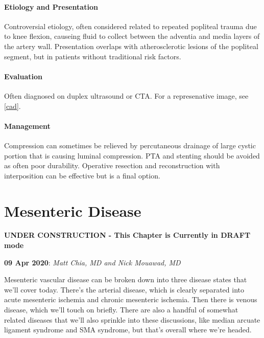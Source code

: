 \documentclass[
]{book}
\begin{document}
\hypertarget{etiology-and-presentation-3}{%
\subsubsection{Etiology and Presentation}\label{etiology-and-presentation-3}}

Controversial etiology, often considered related to repeated popliteal
trauma due to knee flexion, causeing fluid to collect between the
adventia and media layers of the artery wall. Presentation overlaps with
atherosclerotic lesions of the popliteal segment, but in patients
without traditional risk factors.

\hypertarget{evaluation-15}{%
\subsubsection{Evaluation}\label{evaluation-15}}

Often diagnosed on duplex ultrasound or CTA. For a represenative image,
see \ref{cad}.

\hypertarget{management-22}{%
\subsubsection{Management}\label{management-22}}

Compression can sometimes be relieved by percutaneous drainage of large
cystic portion that is causing luminal compression. PTA and stenting
should be avoided as often poor durability. Operative resection and
reconstruction with interposition can be effective but is a final
option.\citep{li2017}

\hypertarget{mesenteric-disease}{%
\chapter{Mesenteric Disease}\label{mesenteric-disease}}

\textbf{UNDER CONSTRUCTION - This Chapter is Currently in DRAFT mode}

\textbf{09 Apr 2020}: \emph{Matt Chia, MD and Nick Mouawad, MD}

Mesenteric vascular disease can be broken down into three disease states
that we'll cover today. There's the arterial disease, which is clearly
separated into acute mesenteric ischemia and chronic mesenteric
ischemia. Then there is venous disease, which we'll touch on briefly.
There are also a handful of somewhat related diseases that we'll also
sprinkle into these discussions, like median arcuate ligament syndrome
and SMA syndrome, but that's overall where we're headed.
\end{document}
